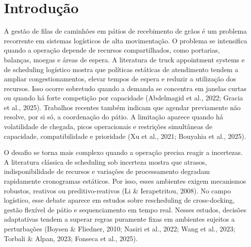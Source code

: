 \documentclass[
  12pt,
  oneside,
  a4paper,
  sumario=tradicional,
  brazil
]{abntex2}
\begin{document}
\tableofcontents*
\cleardoublepage

\textual
\OnehalfSpacing

\chapter{Introdução}

A gest\~ao de filas de caminh\~oes em p\'atios de recebimento de gr\~aos \'e um problema recorrente em sistemas log\'isticos de alta movimenta\c{c}\~ao. O problema se intensifica quando a opera\c{c}\~ao depende de recursos compartilhados, como portarias, balan\c{c}as, moegas e \'areas de espera. A literatura de truck appointment systems e de scheduling log\'istico mostra que pol\'iticas est\'aticas de atendimento tendem a ampliar congestionamentos, elevar tempos de espera e reduzir a utiliza\c{c}\~ao dos recursos. Isso ocorre sobretudo quando a demanda se concentra em janelas curtas ou quando h\'a forte competi\c{c}\~ao por capacidade (Abdelmagid et al., 2022; Gracia et al., 2025). Trabalhos recentes tamb\'em indicam que agendar previamente n\~ao resolve, por si s\'o, a coordena\c{c}\~ao do p\'atio. A limita\c{c}\~ao aparece quando h\'a volatilidade de chegada, picos operacionais e restri\c{c}\~oes simult\^aneas de capacidade, compatibilidade e prioridade (Xu et al., 2021; Bouyahia et al., 2025).

O desafio se torna mais complexo quando a opera\c{c}\~ao precisa reagir a incertezas. A literatura cl\'assica de scheduling sob incerteza mostra que atrasos, indisponibilidade de recursos e varia\c{c}\~oes de processamento degradam rapidamente cronogramas est\'aticos. Por isso, esses ambientes exigem mecanismos robustos, reativos ou preditivo-reativos (Li \& Ierapetritou, 2008). No campo log\'istico, esse debate aparece em estudos sobre rescheduling de cross-docking, gest\~ao flex\'ivel de p\'atio e sequenciamento em tempo real. Nesses estudos, decis\~oes adaptativas tendem a superar regras puramente fixas em ambientes sujeitos a perturba\c{c}\~oes (Boysen \& Fliedner, 2010; Nasiri et al., 2022; Wang et al., 2023; Torbali \& Alpan, 2023; Fonseca et al., 2025).
\end{document}
